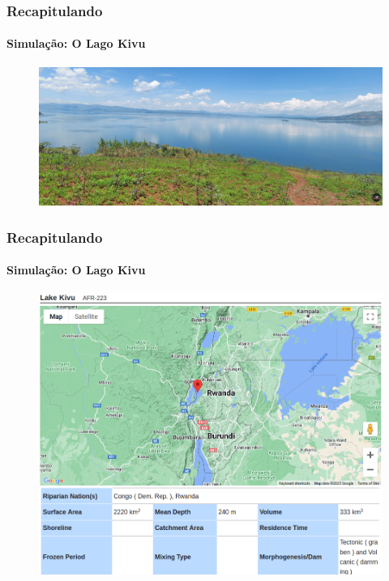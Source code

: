 \documentclass[aspectratio=169]{beamer} %
\begin{document}
{{\begin{frame}
\frametitle{Recapitulando}
	\framesubtitle{Simulação: O Lago Kivu}
	\pause
	\begin{figure}
		\centering
		\includegraphics[scale=0.15]{images/kivu2.png}
	\end{figure}
\end{frame} 
}




{
\begin{frame}

\frametitle{Recapitulando}
	\framesubtitle{Simulação: O Lago Kivu}
	\pause
	\begin{figure}
		\centering
		\includegraphics[scale=0.25]{images/kivu3.png}
	\end{figure}
\end{frame} 
}


}
\end{document}
